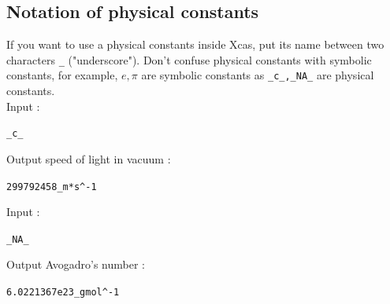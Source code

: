 \documentclass[a4paper,11pt]{book}
\begin{document}
\subsection{Notation of physical constants}\index{\_}
If you want to use a physical constants inside Xcas, put
its name between two characters {\tt \_} 
("underscore"). Don't confuse  physical constants with symbolic constants, 
for example, $e,\pi$ are symbolic constants as {\tt \_c\_,\_NA\_} are physical 
constants.\\
Input :
\begin{center}{\tt \_c\_ }\end{center}
Output speed of light in vacuum :
\begin{center}{\tt 299792458\_m*s\verb|^|-1}\end{center}
Input :
\begin{center}{\tt \_NA\_ }\end{center}
Output Avogadro's number :
\begin{center}{\tt 6.0221367e23\_gmol\verb|^|-1}\end{center}
\end{document}
